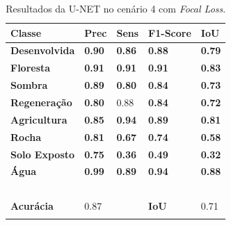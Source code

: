 \documentclass[%
  10pt,%
  aspectratio = 169,%
  compress,%
  t,%
  english,%
  brazilian,%
  tikz,
]{beamer}
\begin{document}
\begin{frame}
\begin{columns}[T]
\begin{table}[!ht]
    \centering
    \caption{Resultados da U-NET no cenário 4 com \textit{Focal Loss}.}%
    \label{tab:res:cen42}%
    \begin{tabular}{lllll}
    \toprule
        \textbf{Classe} & \textbf{Prec} & \textbf{Sens} & \textbf{F1-Score} & \textbf{IoU} \\
        \midrule
        \textbf{Desenvolvida}    & \textbf{0.90} & \textbf{0.86} & \textbf{0.88} & \textbf{0.79}  \\ 
        \textbf{Floresta}        & \textbf{0.91} & \textbf{0.91} & \textbf{0.91} & \textbf{0.83}  \\ 
        \textbf{Sombra}          & \textbf{0.89} & \textbf{0.80} & \textbf{0.84} & \textbf{0.73}  \\ 
        \textbf{Regeneração}     & \textbf{0.80} & 0.88 & \textbf{0.84} & \textbf{0.72}  \\ 
        \textbf{Agricultura}     & \textbf{0.85} & \textbf{0.94} & \textbf{0.89} & \textbf{0.81}  \\ 
        \textbf{Rocha}           & \textbf{0.81} & \textbf{0.67} & \textbf{0.74} & \textbf{0.58}  \\ 
        \textbf{Solo Exposto}    & \textbf{0.75} & \textbf{0.36} & \textbf{0.49} & \textbf{0.32}  \\ 
        \textbf{Água}            & \textbf{0.99} & \textbf{0.89} & \textbf{0.94} & \textbf{0.88}  \\ 
        \textbf{} & ~ & ~ & ~ & ~ \\ 
        \textbf{Acurácia} & 0.87 & ~ & \textbf{IoU} & 0.71 \\
        \bottomrule
        \addlinespace
    \end{tabular}
\end{table}

\end{columns}
\end{frame}
\end{document}
